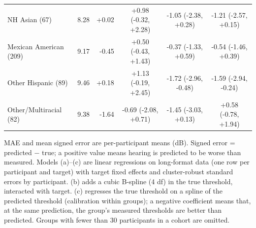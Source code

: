 \begin{table}
{\begin{tabular}{l rr ccc}
\quad NH Asian (67) & 8.28 & +0.02 & +0.98 (-0.32, +2.28) & -1.05 (-2.38, +0.28) & -1.21 (-2.57, +0.15) \\
\quad Mexican American (209) & 9.17 & -0.45 & +0.50 (-0.43, +1.43) & -0.37 (-1.33, +0.59) & -0.54 (-1.46, +0.39) \\
\quad Other Hispanic (89) & 9.46 & +0.18 & +1.13 (-0.19, +2.45) & -1.72 (-2.96, -0.48) & -1.59 (-2.94, -0.24) \\
\quad Other/Multiracial (82) & 9.38 & -1.64 & -0.69 (-2.08, +0.71) & -1.45 (-3.03, +0.13) & +0.58 (-0.78, +1.94) \\
\bottomrule
\end{tabular}}
\par\smallskip\raggedright
MAE and mean signed error are per-participant means (dB). Signed error = predicted $-$ true; a positive value means hearing is predicted to be worse than measured. Models (a)--(c) are linear regressions on long-format data (one row per participant and target) with target fixed effects and cluster-robust standard errors by participant. (b) adds a cubic B-spline (4 df) in the true threshold, interacted with target. (c) regresses the true threshold on a spline of the predicted threshold (calibration within groups); a negative coefficient means that, at the same prediction, the group's measured thresholds are better than predicted. Groups with fewer than 30 participants in a cohort are omitted.
\end{table}
